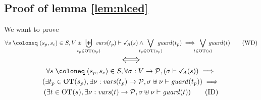 \documentclass{article}
\begin{document}
\subsection{Proof of lemma \ref{lem:nlced}}\label{apx:lemnlced}
We want to prove
\[ \forall s \defobject \mpar{s_p, s_c} \in S, V \uplus \biguplus_\subbox{t_p \in \fOT{s_p}} \fvars{t_p} \vdash \reach{A}\mpar{s} \wedge \bigvee_\subbox{t_p \in \fOT{s_p}} \fguard{t_p} \implies \bigvee_\subbox{t \in \fOT{s}} \fguard{t} \tag{WD}\label{eq:nlcWD} \]
\[ \text{\Large\(\displaystyle \iff\)} \]
\begin{multline*}
	\forall s \defobject \mpar{s_p, s_c} \in S, \forall \sigma: V \to \values, \mpar{\sigma \vdash \reach{A}\mpar{s}} \implies \\
	\mpar{\exists t_p \in \fOT{s_p}, \exists \nu: \fvars{t_p} \to \values, \sigma \uplus \nu \vdash \fguard{t_p}} \implies \\
	\mpar{\exists t \in \fOT{s}, \exists \nu: \fvars{t} \to \values, \sigma \uplus \nu \vdash \fguard{t}} \tag{ID}\label{eq:nlcID}
\end{multline*}
\end{document}
